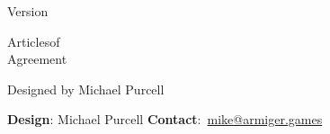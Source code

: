\documentclass[a6paper, parskip=half, DIV=14, 12pt]{scrartcl}
\begin{document}
{%
\thispagestyle{empty}
		\enlargethispage{3.5\baselineskip} %
\setmainfont[Scale=1.0]{Caslon Antique}
\begin{center}
\makeatletter
{\footnotesize Version \@version}
\makeatother


\vfill

{
\setmainfont[Scale=1.7]{Tradewinds}
\Huge
\textcolor{bandana}{Articles\hfill of\\Agreement}
}

\vspace{-0.5cm}


\vfill{}

{
\setmainfont{Aquiline Two}
\Large
\textcolor{bandana}{Designed by Michael Purcell}
}
\end{center}
}

\newpage


\bigskip

\bigskip



\newpage



\newpage



\newpage



\newpage



\vfill

\hrulefill

{\footnotesize \textbf{Design}: Michael Purcell \hfill \textbf{Contact}:~\href{mailto:mike@armiger.games}{mike@armiger.games}}


\newpage


\end{document}
